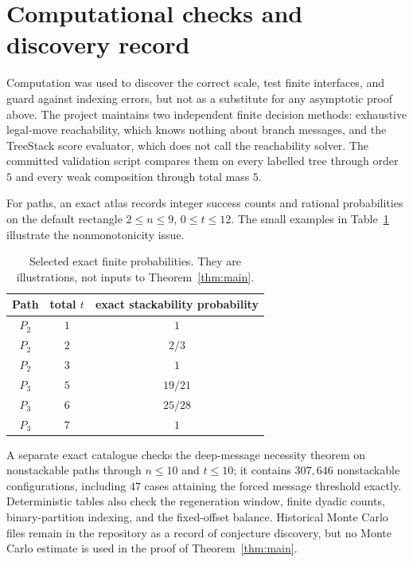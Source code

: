 \documentclass[11pt]{article}
\begin{document}
\section{Computational checks and discovery record}\label{sec:computation}

Computation was used to discover the correct scale, test finite interfaces,
and guard against indexing errors, but not as a substitute for any asymptotic
proof above.  The project maintains two independent finite decision methods:
exhaustive legal-move reachability, which knows nothing about branch messages,
and the TreeStack score evaluator, which does not call the reachability solver.
The committed validation script compares them on every labelled tree through
order $5$ and every weak composition through total mass $5$.

For paths, an exact atlas records integer success counts and rational
probabilities on the default rectangle $2\le n\le9$, $0\le t\le12$.  The
small examples in Table~\ref{tab:finite} illustrate the nonmonotonicity issue.

\begin{table}[ht]
\centering
\begin{tabular}{@{}ccc@{}}
\toprule
Path & total $t$ & exact stackability probability \\
\midrule
$P_2$ & $1$ & $1$ \\
$P_2$ & $2$ & $2/3$ \\
$P_2$ & $3$ & $1$ \\
$P_3$ & $5$ & $19/21$ \\
$P_3$ & $6$ & $25/28$ \\
$P_3$ & $7$ & $1$ \\
\bottomrule
\end{tabular}
\caption{Selected exact finite probabilities.  They are illustrations, not
inputs to Theorem~\ref{thm:main}.}
\label{tab:finite}
\end{table}

A separate exact catalogue checks the deep-message necessity theorem on
nonstackable paths through $n\le10$ and $t\le10$; it contains $307{,}646$
nonstackable configurations, including $47$ cases attaining the forced
message threshold exactly.  Deterministic tables also check the regeneration
window, finite dyadic counts, binary-partition indexing, and the fixed-offset
balance.  Historical Monte Carlo files remain in the repository as a record of
conjecture discovery, but no Monte Carlo estimate is used in the proof of
Theorem~\ref{thm:main}.
\end{document}

